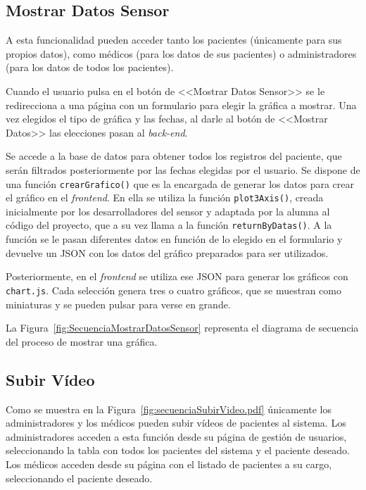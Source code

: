 \subsection{Mostrar Datos Sensor}
A esta funcionalidad pueden acceder tanto los pacientes (únicamente para sus propios datos), como médicos (para los datos de sus pacientes) o administradores (para los datos de todos los pacientes).

Cuando el usuario pulsa en el botón de <<Mostrar Datos Sensor>> se le redirecciona a una página con un formulario para elegir la gráfica a mostrar. Una vez elegidos el tipo de gráfica y las fechas, al darle al botón de <<Mostrar Datos>> las elecciones pasan al \textit{back-end}.

Se accede a la base de datos para obtener todos los registros del paciente, que serán filtrados posteriormente por las fechas elegidas por el usuario. 
Se dispone de una función \texttt{crearGrafico()} que es la encargada de generar los datos para crear el gráfico en el \textit{frontend}. En ella se utiliza la función \texttt{plot3Axis()}, creada inicialmente por los desarrolladores del sensor y adaptada por la alumna al código del proyecto, que a su vez llama a la función \texttt{returnByDatas()}. A la función se le pasan diferentes datos en función de lo elegido en el formulario y devuelve un JSON con los datos del gráfico preparados para ser utilizados.

Posteriormente, en el \textit{frontend} se utiliza ese JSON para generar los gráficos con \texttt{chart.js}. Cada selección genera tres o cuatro gráficos, que se muestran como miniaturas y se pueden pulsar para verse en grande.

La Figura~\ref{fig:SecuenciaMostrarDatosSensor} representa el diagrama de secuencia del proceso de mostrar una gráfica.




\subsection{Subir Vídeo}
Como se muestra en la Figura~\ref{fig:secuenciaSubirVideo.pdf} únicamente los administradores y los médicos pueden subir vídeos de pacientes al sistema. Los administradores acceden a esta función desde su página de gestión de usuarios, seleccionando la tabla con todos los pacientes del sistema y el paciente deseado. Los médicos acceden desde su página con el listado de pacientes a su cargo, seleccionando el paciente deseado.

